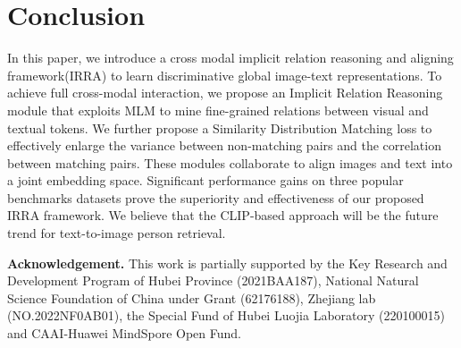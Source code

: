 \documentclass[10pt,twocolumn,letterpaper]{article}
\begin{document}
\section{Conclusion}
In this paper, we introduce a cross modal implicit relation reasoning and aligning framework(IRRA) to learn discriminative global image-text representations. To achieve full cross-modal interaction, we propose an Implicit Relation Reasoning module that exploits MLM to mine fine-grained relations between visual and textual tokens. 
We further propose a Similarity Distribution Matching loss to effectively enlarge the variance between non-matching pairs and the correlation between matching pairs.
These modules collaborate to align images and text into a joint embedding space. Significant performance gains on three popular benchmarks datasets prove the superiority and effectiveness of our proposed IRRA framework. We believe that the CLIP-based approach will be the future trend for text-to-image person retrieval.

\noindent\textbf{Acknowledgement.} This work is partially supported by the Key Research and Development Program of Hubei Province (2021BAA187), National Natural Science Foundation of China under Grant (62176188), Zhejiang lab (NO.2022NF0AB01), the Special Fund of Hubei Luojia Laboratory (220100015) and CAAI-Huawei MindSpore Open Fund.
{\small


}
\end{document}
